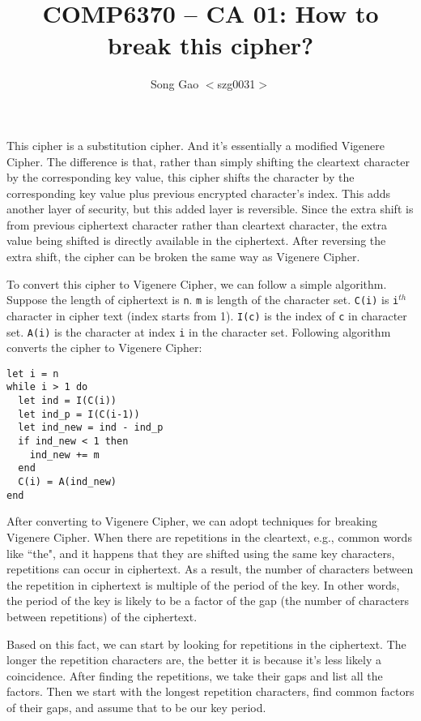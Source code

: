 \documentclass{article}
\title{COMP6370 -- CA 01: How to break this cipher?}
\author{Song Gao $<$szg0031$>$}
\begin{document}
\maketitle

\par{This cipher is a substitution cipher. And it's essentially a modified Vigenere Cipher. The difference is that, rather than simply shifting the cleartext character by the corresponding key value, this cipher shifts the character by the corresponding key value plus previous encrypted character's index. This adds another layer of security, but this added layer is reversible. Since the extra shift is from previous ciphertext character rather than cleartext character, the extra value being shifted is directly available in the ciphertext. After reversing the extra shift, the cipher can be broken the same way as Vigenere Cipher.}

\par{To convert this cipher to Vigenere Cipher, we can follow a simple algorithm. Suppose the length of ciphertext is {\tt n}. {\tt m} is length of the character set. {\tt C(i)} is {\tt i}$^{th}$ character in cipher text (index starts from 1). {\tt I(c)} is the index of {\tt c} in character set. {\tt A(i)} is the character at index {\tt i} in the character set. Following algorithm converts the cipher to Vigenere Cipher:
\begin{lstlisting}
let i = n
while i > 1 do
  let ind = I(C(i))
  let ind_p = I(C(i-1))
  let ind_new = ind - ind_p
  if ind_new < 1 then
    ind_new += m
  end
  C(i) = A(ind_new)
end
\end{lstlisting}
}

\par{After converting to Vigenere Cipher, we can adopt techniques for breaking Vigenere Cipher. When there are repetitions in the cleartext, e.g., common words like ``the", and it happens that they are shifted using the same key characters, repetitions can occur in ciphertext. As a result, the number of characters between the repetition in ciphertext is multiple of the period of the key. In other words, the period of the key is likely to be a factor of the gap (the number of characters between repetitions) of the ciphertext.}

\par{Based on this fact, we can start by looking for repetitions in the ciphertext. The longer the repetition characters are, the better it is because it's less likely a coincidence. After finding the repetitions, we take their gaps and list all the factors. Then we start with the longest repetition characters, find common factors of their gaps, and assume that to be our key period.}
\end{document}
